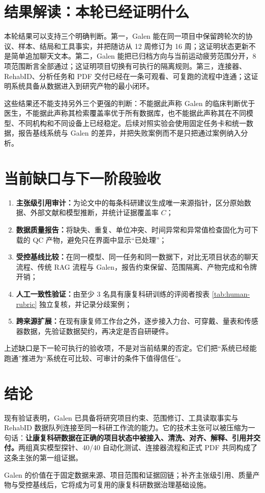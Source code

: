 \documentclass[11pt,a4paper]{article}
\begin{document}
\section{结果解读：本轮已经证明什么}
本轮结果可以支持三个明确判断。第一，Galen 能在同一项目中保留跨轮次的协议、样本、结局和工具事实，并把随访从 12 周修订为 16 周；这证明状态更新不是简单追加聊天文本。第二，Galen 能把已归档方向与当前运动疲劳范围分开，8 项范围断言全部通过；这证明项目切换有可执行的隔离规则。第三，连接器、RehabID、分析任务和 PDF 交付已经在一条可观看、可复跑的流程中连通；这证明系统具备从数据进入到研究产物的最小闭环。

这些结果还不能支持另外三个更强的判断：不能据此声称 Galen 的临床判断优于医生，不能据此声称其检索覆盖率优于所有数据库，也不能据此声称其在不同模型、不同机构和不同设备上已经稳定。后续对照实验会使用固定任务卡和统一数据，报告基线系统与 Galen 的差异，并把失败案例而不是只把通过案例纳入分析。

\section{当前缺口与下一阶段验收}
\begin{enumerate}[leftmargin=2.1em,itemsep=4pt]
\item \textbf{主张级引用审计：}为论文中的每条科研建议生成唯一来源指针，区分原始数据、外部文献和模型推断，并统计证据覆盖率 $C$；
\item \textbf{数据质量报告：}将缺失、重复、单位冲突、时间异常和异常值检查固化为可下载的 QC 产物，避免只在界面中显示“已处理”；
\item \textbf{受控基线比较：}在同一模型、同一任务和同一数据下，对比无项目状态的聊天流程、传统 RAG 流程与 Galen，报告约束保留、范围隔离、产物完成和令牌开销；
\item \textbf{人工一致性验证：}由至少 3 名具有康复科研训练的评阅者按表 \ref{tab:human-rubric} 独立复核，并记录分歧案例；
\item \textbf{跨来源扩展：}在现有康复师工作台之外，逐步接入力台、可穿戴、量表和传感器数据，先验证数据契约，再决定是否自研硬件。
\end{enumerate}

上述缺口是下一轮可执行的验收项，不是对当前结果的否定。它们把“系统已经能跑通”推进为“系统在可比较、可审计的条件下值得信任”。

\section{结论}
现有验证表明，Galen 已具备将研究项目约束、范围修订、工具读取事实与 RehabID 数据队列连接至同一科研工作流的能力。它的技术主张可以被压缩为一句话：\textbf{让康复科研数据在正确的项目状态中被接入、清洗、对齐、解释、引用并交付。}两组真实模型探针、40/40 自动化测试、连接器流程和正式 PDF 共同构成了这条主张的第一组证据。

Galen 的价值在于固定数据来源、项目范围和证据回链；补齐主张级引用、质量产物与受控基线后，它将成为可复用的康复科研数据治理基础设施。
\end{document}
